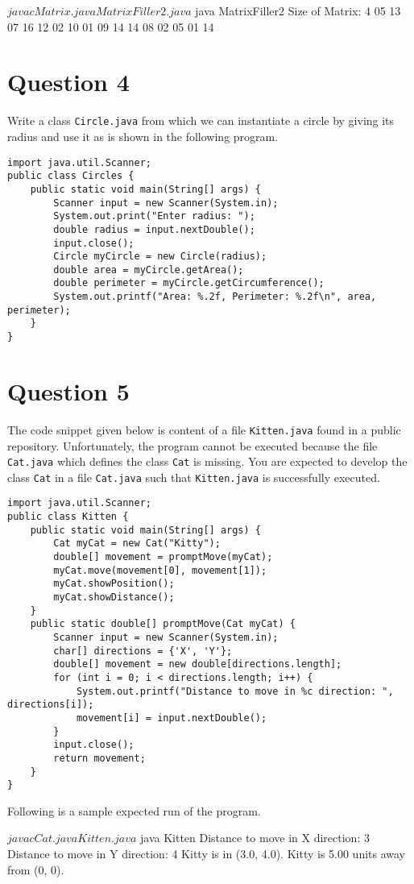 \begin{terminal}
$ javac Matrix.java MatrixFiller2.java
$ java MatrixFiller2
Size of Matrix: 4
 05 13 07 16
 12 02 10 01
 09 14 14 08
 02 05 01 14
\end{terminal}

\section*{Question 4}

Write a class \texttt{Circle.java} from which we can instantiate a circle by giving its radius and use it as is shown in the following program.

\lstset{caption=}
\lstset{language=Java,tabsize=4}
\begin{lstlisting}
import java.util.Scanner;
public class Circles {
	public static void main(String[] args) {
		Scanner input = new Scanner(System.in);
		System.out.print("Enter radius: ");
		double radius = input.nextDouble();
		input.close();
		Circle myCircle = new Circle(radius);
		double area = myCircle.getArea();
		double perimeter = myCircle.getCircumference();
		System.out.printf("Area: %.2f, Perimeter: %.2f\n", area, perimeter);
	}
}
\end{lstlisting}

\section*{Question 5}
The code snippet given below is content of a file \texttt{Kitten.java} found in a public repository.
Unfortunately, the program cannot be executed because the file \texttt{Cat.java} which defines the class \texttt{Cat} is missing.
You are expected to develop the class \texttt{Cat} in a file \texttt{Cat.java} such that \texttt{Kitten.java} is successfully executed.

\lstset{caption=}
\lstset{language=Java,tabsize=4}
\begin{lstlisting}
import java.util.Scanner;
public class Kitten {
	public static void main(String[] args) {
		Cat myCat = new Cat("Kitty");
		double[] movement = promptMove(myCat);
		myCat.move(movement[0], movement[1]);
		myCat.showPosition();
		myCat.showDistance();
	}
	public static double[] promptMove(Cat myCat) {
		Scanner input = new Scanner(System.in);
		char[] directions = {'X', 'Y'};
		double[] movement = new double[directions.length];
		for (int i = 0; i < directions.length; i++) {
			System.out.printf("Distance to move in %c direction: ", directions[i]);
			movement[i] = input.nextDouble();
		}
		input.close();
		return movement;
	}
}
\end{lstlisting}

Following is a sample expected run of the program.

\begin{terminal}
$ javac Cat.java Kitten.java
$ java Kitten
Distance to move in X direction: 3
Distance to move in Y direction: 4
Kitty is in (3.0, 4.0).
Kitty is 5.00 units away from (0, 0).
\end{terminal}
